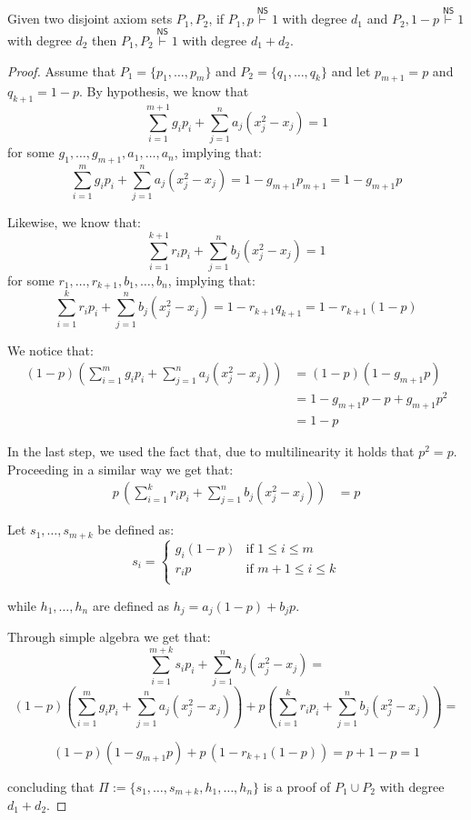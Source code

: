 \begin{lemma}
    \label{union_ref}
    Given two disjoint axiom sets $P_1, P_2$, if $P_1, p \stackrel{\mathsf{NS}}{\vdash} 1$ with degree $d_1$ and $P_2, 1-p \stackrel{\mathsf{NS}}{\vdash} 1$ with degree $d_2$ then $P_1, P_2 \stackrel{\mathsf{NS}}{\vdash} 1$ with degree $d_1 + d_2$.
\end{lemma}

\begin{proof}
    Assume that $P_1 = \{p_1, \ldots, p_m\}$ and $P_2 = \{q_1, \ldots, q_k\}$ and let $p_{m+1} = p$ and $q_{k+1} = 1-p$. By hypothesis, we know that
    \[\sum_{i = 1}^{m+1} g_i p_i + \sum_{j = 1}^n a_j (x_j^2-x_j) = 1\]
    for some $g_1, \ldots, g_{m+1}, a_1, \ldots, a_n$, implying that:
    \[\sum_{i = 1}^{m} g_i p_i + \sum_{j = 1}^n a_j (x_j^2-x_j) = 1 - g_{m+1} p_{m+1} = 1-g_{m+1} p\]
    
    Likewise, we know that:
    \[\sum_{i = 1}^{k+1} r_i p_i + \sum_{j = 1}^n b_j (x_j^2-x_j) = 1\]
    for some $r_1, \ldots, r_{k+1}, b_1, \ldots, b_n$, implying that:
    \[\sum_{i = 1}^{k} r_i p_i + \sum_{j = 1}^n b_j (x_j^2-x_j) = 1-r_{k+1}q_{k+1} = 1-r_{k+1}(1-p)\]

    We notice that:
    \[\begin{split}
        (1-p) \left (\sum_{i = 1}^{m} g_i p_i + \sum_{j = 1}^n a_j (x_j^2-x_j) \right ) &= (1-p)(1-g_{m+1} p) \\
        &= 1-g_{m+1} p - p + g_{m+1} p^2 \\
        &= 1-p 
    \end{split}\]

    In the last step, we used the fact that, due to multilinearity it holds that $p^2 = p$. Proceeding in a similar way we get that:
    \[\begin{split}
        p\, \left (\sum_{i = 1}^{k} r_i p_i + \sum_{j = 1}^n b_j (x_j^2-x_j)  \right ) &= p 
    \end{split}\]

    Let $s_1, \ldots, s_{m+k}$ be defined as:
    \[s_i = \left \{ \begin{array}{ll}
        g_i (1-p) & \text{if } 1 \leq i \leq m \\
        r_i p & \text{if } m+1 \leq i \leq k \\
    \end{array} \right .\]
    
    while $h_1, \ldots, h_n$ are defined as $h_j = a_j(1-p) + b_jp$.
    
    Through simple algebra we get that:
    \[\sum_{i = 1}^{m+k} s_i p_i + \sum_{j = 1}^n h_j (x_j^2-x_j) =\]
    \[(1-p) \left (\sum_{i = 1}^{m} g_i p_i + \sum_{j = 1}^n a_j (x_j^2-x_j) \right ) + p \left (\sum_{i = 1}^{k} r_i p_i + \sum_{j = 1}^n b_j (x_j^2-x_j)  \right )=\]
    
    \[(1-p)(1-g_{m+1}p) + p\,(1-r_{k+1}(1-p)) = p + 1- p = 1\]

    concluding that $\Pi := \{s_1, \ldots, s_{m+k}, h_1, \ldots, h_n\}$ is a proof of $P_1 \cup P_2$ with degree $d_1 + d_2$.

\end{proof}

